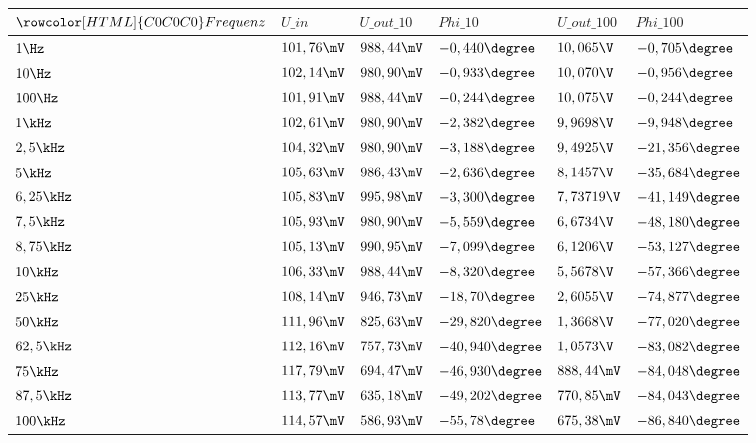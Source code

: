 \begin{table}[H]
\centering
\caption{}
\label{tab:my-table}
\begin{tabular}{|l|l|l|l||l|l|}
\hline
$\rowcolor[HTML]{C0C0C0} 
Frequenz $&$ U\_in     $&$ U\_out\_10 $&$ Phi\_10 $&$ U\_out\_100 $&$ Phi\_100 $\\ \hline
$1\Hz        $&$ 101,76\mV $&$ 988,44\mV  $&$ -0,440\degree  $&$ 10,065\V      $&$ -0,705\degree   $\\ \hline
$10\Hz      $&$ 102,14\mV $&$ 980,90\mV  $&$ -0,933\degree  $&$ 10,070\V      $&$ -0,956\degree   $\\ \hline
$100\Hz      $&$ 101,91\mV $&$ 988,44\mV  $&$ -0,244\degree  $&$ 10,075\V      $&$ -0,244\degree   $\\ \hline
$1\kHz      $&$ 102,61\mV $&$ 980,90\mV  $&$ -2,382\degree  $&$ 9,9698\V      $&$ -9,948\degree  $\\ \hline
$2,5\kHz    $&$ 104,32\mV $&$ 980,90\mV  $&$ -3,188\degree  $&$ 9,4925\V      $&$ -21,356\degree  $\\ \hline
$5\kHz      $&$ 105,63\mV $&$ 986,43\mV  $&$ -2,636\degree  $&$ 8,1457 \V     $&$ -35,684\degree  $\\ \hline
$6,25\kHz   $&$ 105,83\mV $&$ 995,98\mV  $&$ -3,300\degree  $&$ 7,73719\V     $&$ -41,149\degree  $\\ \hline
$7,5\kHz    $&$ 105,93\mV $&$ 980,90\mV  $&$ -5,559\degree  $&$ 6,6734\V      $&$ -48,180\degree  $\\ \hline
$8,75\kHz   $&$ 105,13\mV $&$ 990,95\mV  $&$ -7,099\degree  $&$ 6,1206\V      $&$ -53,127\degree  $\\ \hline
$10\kHz     $&$ 106,33\mV $&$ 988,44\mV  $&$ -8,320\degree  $&$ 5,5678\V      $&$ -57,366\degree  $\\ \hline
$25\kHz     $&$ 108,14\mV $&$ 946,73\mV  $&$ -18,70\degree  $&$ 2,6055\V      $&$ -74,877\degree  $\\ \hline
$50\kHz     $&$ 111,96\mV $&$ 825,63\mV  $&$ -29,820\degree $&$ 1,3668\V      $&$ -77,020\degree  $\\ \hline
$62,5\kHz   $&$ 112,16\mV $&$ 757,73\mV  $&$ -40,940\degree $&$ 1,0573\V      $&$ -83,082\degree  $\\ \hline
$75\kHz     $&$ 117,79\mV $&$ 694,47\mV  $&$ -46,930\degree $&$ 888,44\mV   $&$ -84,048\degree  $\\ \hline
$87,5\kHz   $&$ 113,77\mV $&$ 635,18\mV  $&$ -49,202\degree $&$ 770,85\mV   $&$ -84,043\degree  $\\ \hline
$100\kHz    $&$ 114,57\mV $&$ 586,93\mV  $&$ -55,78\degree  $&$ 675,38\mV   $&$ -86,840\degree  $\\ \hline

\end{tabular}
\end{table}
